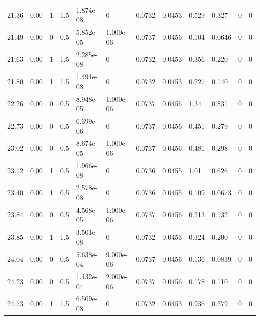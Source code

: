 \documentclass[preview]{standalone}
\begin{document}
{{{\begin{tabular}{L{1.2cm}C{1.2cm} C{0.3cm}C{0.5cm} C{1.4cm}C{1.4cm} C{1.4cm}C{1.4cm} C{1.6cm}C{1.6cm} C{1.6cm}C{1.6cm}}
  21.36  &  0.00  & 1     & 1.5 &  1.874e-08  & 0  &  0.0732&   0.0453& 0.529 & 0.327   &  0 & 0  \\ 
  21.49  &  0.00  & 0     & 0.5 &  5.852e-05  & 1.000e-06  &  0.0737&   0.0456& 0.104 & 0.0646   &  0 & 0  \\ 
  21.63  &  0.00  & 1     & 1.5 &  2.285e-08  & 0  &  0.0732&   0.0453& 0.356 & 0.220   &  0 & 0  \\ 
  21.80  &  0.00  & 1     & 1.5 &  1.491e-08  & 0  &  0.0732&   0.0453& 0.227 & 0.140   &  0 & 0  \\ 
  22.26  &  0.00  & 0     & 0.5 &  8.948e-05  & 1.000e-06  &  0.0737&   0.0456& 1.34 & 0.831   &  0 & 0  \\ 
  22.73  &  0.00  & 0     & 0.5 &  6.399e-06  & 0  &  0.0737&   0.0456& 0.451 & 0.279   &  0 & 0  \\ 
  23.02  &  0.00  & 0     & 0.5 &  8.674e-05  & 1.000e-06  &  0.0737&   0.0456& 0.481 & 0.298   &  0 & 0  \\ 
  23.12  &  0.00  & 1     & 0.5 &  1.966e-08  & 0  &  0.0736&   0.0455& 1.01 & 0.626   &  0 & 0  \\ 
  23.40  &  0.00  & 1     & 0.5 &  2.578e-08  & 0  &  0.0736&   0.0455& 0.109 & 0.0673   &  0 & 0  \\ 
  23.84  &  0.00  & 0     & 0.5 &  4.568e-05  & 1.000e-06  &  0.0737&   0.0456& 0.213 & 0.132   &  0 & 0  \\ 
  23.85  &  0.00  & 1     & 1.5 &  3.501e-08  & 0  &  0.0732&   0.0453& 0.324 & 0.200   &  0 & 0  \\ 
  24.04  &  0.00  & 0     & 0.5 &  5.638e-04  & 9.000e-06  &  0.0737&   0.0456& 0.136 & 0.0839   &  0 & 0  \\ 
  24.23  &  0.00  & 0     & 0.5 &  1.132e-04  & 2.000e-06  &  0.0737&   0.0456& 0.178 & 0.110   &  0 & 0  \\ 
  24.73  &  0.00  & 1     & 1.5 &  6.509e-08  & 0  &  0.0732&   0.0453& 0.936 & 0.579   &  0 & 0  \\ 
\hline 
\end{tabular} 

}}}
\end{document}
